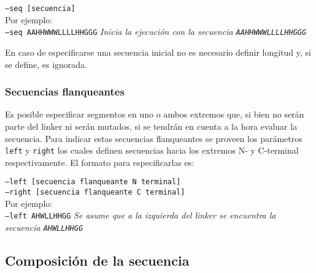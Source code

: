 \indent \texttt{--seq [secuencia]} 
\\Por ejemplo: \\
\indent \texttt{--seq AAHHWWWLLLLHHGGG} \hspace{0.5cm} \textit{Inicia la ejecución con la secuencia \texttt{AAHHWWWLLLLHHGGG}}

En caso de especificarse una secuencia inicial no es necesario definir longitud y, si se define, es ignorada.



\subsubsection{Secuencias flanqueantes}\label{flanqueantes} 

Es posible especificar segmentos en uno o ambos extremos que, si bien no serán parte del linker ni serán mutados, si se tendrán en cuenta a la hora evaluar la secuencia.
Para indicar estas secuencias flanqueantes se proveen los parámetros \texttt{left} y \texttt{right} los cuales definen secuencias hacia los extremos N- y C-terminal respectivamente.
El formato para especificarlas es:


\indent \texttt{--left  [secuencia flanqueante N terminal]} \\
\indent \texttt{--right [secuencia flanqueante C terminal]} 
\\Por ejemplo: \\
\indent \texttt{--left AHWLLHHGG} \hspace{0.5cm} \textit{Se asume que a la izquierda del linker se encuentra la secuencia \texttt{AHWLLHHGG}}





\subsection{Composición de la secuencia} \label{composicion}

